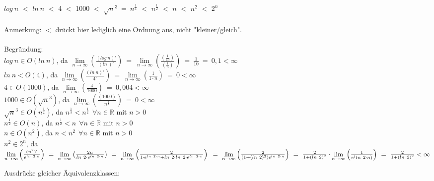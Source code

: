\documentclass[fleqn]{article}
\newcommand{\R}{\mathbb{R}}
\begin{document}
\section{}%
\subsection{}%
$log ~ n$ $<$ $ln ~ n$ $<$ 4 $<$ 1000 $<$ $\sqrt{n}^3 ~=~ n^\frac{1}{3}$ $<$ $n^{\frac{1}{2}}$ $<$ $n$ $<$ $n^2$ $<$ $2^n$ \\
\\
Anmerkung: $<$ drückt hier lediglich eine Ordnung aus, nicht "kleiner/gleich".\\
\\
Begründung:\\
$log ~ n \in O(ln ~ n)$, da $\lim\limits_{n \to \infty}
        \left(
            \frac{(log ~ n)'}{(ln ~ )'}
        \right)
    ~=~ \lim\limits_{n \to \infty}
        \left(
            \frac{
                \left(\frac{1}{2n}\right)}{
                \left(\frac{1}{n}\right)
            }
        \right)
    ~=~ \frac{1}{10} ~=~ 0,1 < \infty$ \\
$ln ~ n < O(4)$, da $\lim\limits_{n \to \infty}
        \left(
            \frac{(ln ~ n)'}{4'}
        \right)
    ~=~ \lim\limits_{n \to \infty}
        \left(
            \frac{1}{1 \cdot n}
        \right)
    ~=~ 0 < \infty$ \\
$4 \in O(1000)$, da $\lim\limits_{n \to \infty}
        \left(
            \frac{4}{1000}
        \right)
    ~=~ 0,004 < \infty$ \\
$1000 \in O(\sqrt{n}^3)$, da $\lim\limits_{n \to \infty}
    \left(
        \frac{(1000)}{n^\frac{1}{3}}
    \right)
    ~=~ 0 < \infty$\\
$\sqrt{n}^3 \in O(n^\frac{1}{2})$, da $n^\frac{1}{3} < n^\frac{1}{2} ~~ \forall n \in \R \text{ mit $n > 0$}$\\
$n^\frac{1}{2} \in O(n)$, da $n^\frac{1}{2} < n ~~ \forall n \in \R \text{ mit $n > 0$}$\\
$n \in O(n^2)$, da $n < n^2 ~~ \forall n \in \R \text{ mit $n > 0$}$\\
$n^2 \in 2^n$, da 
\begin{math}
    \lim\limits_{n \to \infty}
        \left(
            \frac{(n^2)'}{e^{ln ~ 2 \cdot n}}
        \right)
    ~=~ \lim\limits_{n \to \infty}
        \left(
            \frac{2n}{ln ~ 2 \cdot e^{ln ~ 2 \cdot n}}
        \right)
    ~=~ \lim\limits_{n \to \infty}
        \left(
            \frac{2}{1 \cdot e^{ln ~ 2 \cdot n} + ln ~ 2 \cdot ln ~ 2 \cdot e^{ln ~ 2 \cdot n}}
        \right)\\
    ~=~ \lim\limits_{n \to \infty}
        \left(
            \frac{2}{(1 + (ln ~ 2)^2) e^{ln ~ 2 \cdot n}}
        \right)
    ~=~ \frac{2}{1 + (ln ~ 2)^2} \cdot \lim\limits_{n \to \infty}
        \left(
            \frac{1}{e^(ln ~ 2 \cdot n)}
        \right)
    ~=~ \frac{2}{1 + (ln ~ 2)^2} < \infty
\end{math}

Ausdrücke gleicher Äquivalenzklassen:\\
\end{document}
